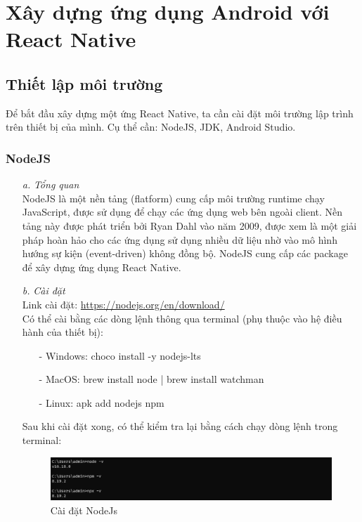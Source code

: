 \section{Xây dựng ứng dụng Android với React Native}

\subsection{Thiết lập môi trường}
Để bắt đầu xây dựng một ứng React Native, ta cần cài đặt môi trường lập trình trên thiết bị của mình. Cụ thể cần: NodeJS, JDK, Android Studio.
\subsubsection{NodeJS}
\begin{enumerate}
    \item[\textit{a.}] {\textit{Tổng quan}}\\
    NodeJS là một nền tảng (flatform) cung cấp môi trường runtime chạy JavaScript, được sử dụng để chạy các ứng dụng web bên ngoài client. Nền tảng này được phát triển bởi Ryan Dahl vào năm 2009, được xem là một giải pháp hoàn hảo cho các ứng dụng sử dụng nhiều dữ liệu nhờ vào mô hình hướng sự kiện (event-driven) không đồng bộ.
    NodeJS cung cấp các package để xây dựng ứng dụng React Native.
    \item[\textit{b.}] {\textit{Cài đặt}}\\
    Link cài đặt: \url{https://nodejs.org/en/download/}\\
    Có thể cài bằng các dòng lệnh thông qua terminal (phụ thuộc vào hệ điều hành của thiết bị):
    \begin{enumerate}
        \item[-] {Windows}: choco install -y nodejs-lts
        \item[-] {MacOS}: brew install node | brew install watchman
        \item[-] {Linux}: apk add nodejs npm
    \end{enumerate}
    Sau khi cài đặt xong, có thể kiểm tra lại bằng cách chạy dòng lệnh trong terminal:
    \begin{figure}[!ht]
        \centering
        \includegraphics[scale=0.5]{images/checkNodeJS.png}
        \caption{Cài đặt NodeJs}
    \end{figure}
\end{enumerate}
